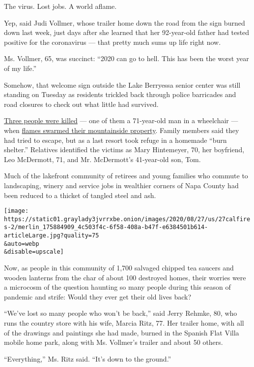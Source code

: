 The virus. Lost jobs. A world aflame.

Yep, said Judi Vollmer, whose trailer home down the road from the sign
burned down last week, just days after she learned that her 92-year-old
father had tested positive for the coronavirus --- that pretty much sums
up life right now.

Ms. Vollmer, 65, was succinct: ``2020 can go to hell. This has been the
worst year of my life.''

Somehow, that welcome sign outside the Lake Berryessa senior center was
still standing on Tuesday as residents trickled back through police
barricades and road closures to check out what little had survived.

\href{https://napavalleyregister.com/news/local/family-identifies-remembers-3-victims-claimed-by-hennessey-fire/article_9d95b2f2-02a2-5b5d-988e-8de48ae42a66.html}{Three
people were killed} --- one of them a 71-year-old man in a wheelchair
--- when
\href{https://www.latimes.com/california/story/2020-08-26/fire-lake-lnu-berryessa-family-couldnt-escape}{flames
swarmed their mountainside property}. Family members said they had tried
to escape, but as a last resort took refuge in a homemade ``burn
shelter.'' Relatives identified the victims as Mary Hintemeyer, 70, her
boyfriend, Leo McDermott, 71, and Mr. McDermott's 41-year-old son, Tom.

Much of the lakefront community of retirees and young families who
commute to landscaping, winery and service jobs in wealthier corners of
Napa County had been reduced to a thicket of tangled steel and ash.

\texttt{[image: https://static01.graylady3jvrrxbe.onion/images/2020/08/27/us/27calfires-2/merlin\_175884909\_4c503f4c-6f58-408a-b47f-e6384501b614-articleLarge.jpg?quality=75\\\&auto=webp\\\&disable=upscale]}

Now, as people in this community of 1,700 salvaged chipped tea saucers
and wooden lanterns from the char of about 100 destroyed homes, their
worries were a microcosm of the question haunting so many people during
this season of pandemic and strife: Would they ever get their old lives
back?

``We've lost so many people who won't be back,'' said Jerry Rehmke, 80,
who runs the country store with his wife, Marcia Ritz, 77. Her trailer
home, with all of the drawings and paintings she had made, burned in the
Spanish Flat Villa mobile home park, along with Ms. Vollmer's trailer
and about 50 others.

``Everything,'' Ms. Ritz said. ``It's down to the ground.''

